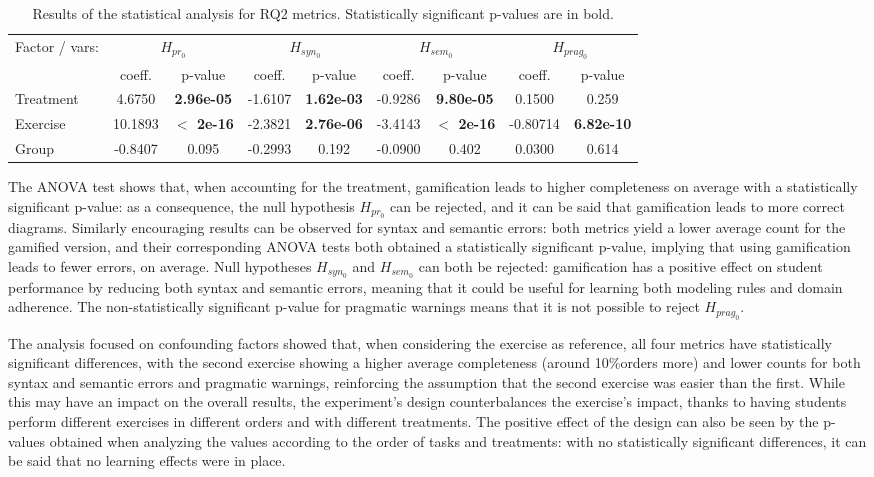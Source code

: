 \begin{table}[ht]
\footnotesize
\centering
\begin{tabular}{lcccccccc}
    \toprule
    Factor / vars: &
    \multicolumn{2}{c}{${H_{pr_{0}}}$} &
    \multicolumn{2}{c}{${H_{syn_{0}}}$} &
    \multicolumn{2}{c}{${H_{sem_{0}}}$} &
    \multicolumn{2}{c}{${H_{prag_{0}}}$} \\
    & coeff. & p-value & coeff. & p-value & coeff. & p-value & coeff. & p-value \\
    \midrule
    Treatment & 4.6750 & \textbf{2.96e-05} & -1.6107 & \textbf{1.62e-03} & -0.9286 & \textbf{9.80e-05} & 0.1500 & 0.259 \\
    Exercise  & 10.1893 & \textbf{$<$ 2e-16} & -2.3821 & \textbf{2.76e-06} & -3.4143 & \textbf{$<$ 2e-16} & -0.80714 & \textbf{6.82e-10} \\
    Group     & -0.8407 & 0.095 & -0.2993 & 0.192 & -0.0900 & 0.402 & 0.0300 & 0.614 \\
    \bottomrule
\end{tabular}
\caption{Results of the statistical analysis for RQ2 metrics. Statistically significant p-values are in bold.}
\label{tab:rq2_4_anova}
\end{table}

The ANOVA test shows that, when accounting for the treatment, gamification leads to higher completeness on average with a statistically significant p-value: as a consequence, the null hypothesis ${H_{pr_{0}}}$ can be rejected, and it can be said that gamification leads to more correct diagrams. Similarly encouraging results can be observed for syntax and semantic errors: both metrics yield a lower average count for the gamified version, and their corresponding ANOVA tests both obtained a statistically significant p-value, implying that using gamification leads to fewer errors, on average. Null hypotheses ${H_{syn_{0}}}$ and ${H_{sem_{0}}}$ can both be rejected: gamification has a positive effect on student performance by reducing both syntax and semantic errors, meaning that it could be useful for learning both modeling rules and domain adherence. The non-statistically significant p-value for pragmatic warnings means that it is not possible to reject ${H_{prag_{0}}}$.


The analysis focused on confounding factors showed that, when considering the exercise as reference, all four metrics have statistically significant differences, with the second exercise showing a higher average completeness (around 10\%orders more) and lower counts for both syntax and semantic errors and pragmatic warnings, reinforcing the assumption that the second exercise was easier than the first. While this may have an impact on the overall results, the experiment's design counterbalances the exercise's impact, thanks to having students perform different exercises in different orders and with different treatments. The positive effect of the design can also be seen by the p-values obtained when analyzing the values according to the order of tasks and treatments: with no statistically significant differences, it can be said that no learning effects were in place.

